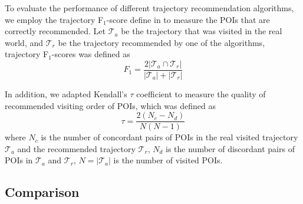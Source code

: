 To evaluate the performance of different trajectory recommendation algorithms,
we employ the trajectory F$_1$-score define in \cite{ijcai15} to measure the POIs that are 
correctly recommended. Let $\mathcal{T}_a$ be the trajectory that was visited in the real world,
and $\mathcal{T}_r$ be the trajectory recommended by one of the algorithms,
trajectory F$_1$-scores was defined as
\begin{displaymath}
    F_1 = \frac{2 |\mathcal{T}_a \cap \mathcal{T}_r|}{|\mathcal{T}_a| + |\mathcal{T}_r|}
\end{displaymath}

In addition, we adapted Kendall's $\tau$ coefficient \cite{kendalltau} to measure the quality of 
recommended visiting order of POIs, which was defined as
\begin{displaymath}
    \tau = \frac{2(N_c - N_d)}{N(N-1)}
\end{displaymath}
where $N_c$ is the number of concordant pairs of POIs in the real visited trajectory $\mathcal{T}_a$ and 
the recommended trajectory $\mathcal{T}_r$, $N_d$ is the number of discordant pairs of POIs in 
$\mathcal{T}_a$ and $\mathcal{T}_r$, $N = |\mathcal{T}_a|$ is the number of visited POIs.


\subsection{Comparison}
\label{experiment:comparison}

